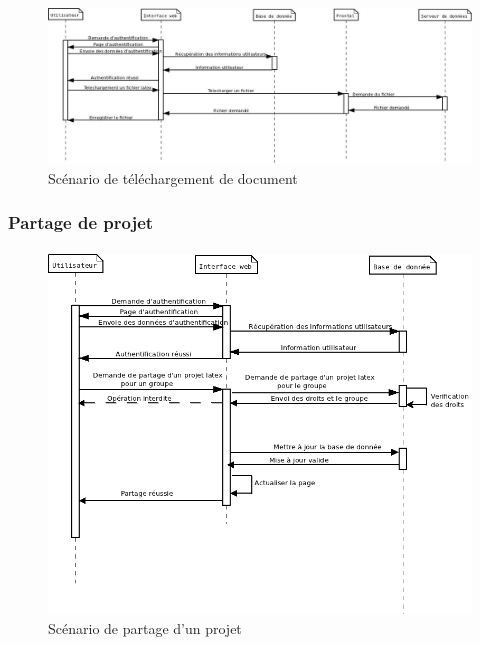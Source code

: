 \documentclass[a4paper,12pt]{article}
\begin{document}
\paragraph{}
\begin{figure}[!ht]
\begin{center}
  \includegraphics[width=1\textwidth, angle=90]{./Diagramme/FichierLatexTelechargement.jpg}
\end{center}
  \caption{Scénario de téléchargement de document}
  \label{download}
\end{figure}

\newpage
\subsubsection{Partage de projet}
\paragraph{}
\begin{figure}[!ht]
\begin{center}
  \includegraphics[width=1\textwidth, angle=90]{./Diagramme/PartageProjet.png}
\end{center}
  \caption{Scénario de partage d'un projet}
  \label{share}
\end{figure}
\end{document}
